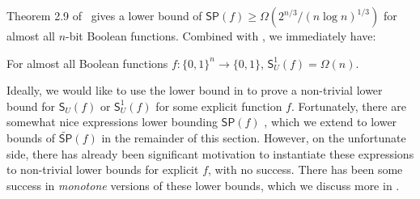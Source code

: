 \documentclass{toc}
\begin{document}
Theorem 2.9 of~\cite{BGW99} gives a lower bound of $\mathsf{SP}(f)\geq \Omega(2^{n/3}/(n\log n)^{1/3})$ for almost all $n$-bit Boolean functions. Combined with , we immediately have:
\begin{theorem}\label{thm:almost-all}
For almost all Boolean functions $f:\{0,1\}^n\rightarrow\{0,1\}$, $\mathsf{S}_U^1(f)=\Omega(n)$.
\end{theorem}

Ideally, we would like to use the lower bound in  to prove a non-trivial lower bound for ${\mathsf{S}_U}(f)$ or $\mathsf{S}_U^1(f)$ for some %
explicit function  %
$f$. Fortunately, there are somewhat nice expressions lower bounding $\mathsf{SP}(f)$ \cite{Raz90,Gal01}, which we extend to lower bounds of $\widetilde{\mathsf{SP}}(f)$ in the remainder of this section. However, on the unfortunate side, there has already been significant motivation to instantiate these expressions to non-trivial lower bounds for %
explicit  %
$f$, with no success. There has been some success in \emph{monotone} versions of these lower bounds, which we discuss more in .



\vskip10pt
\end{document}

